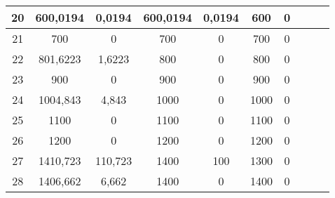 \documentclass[a4paper,12pt]{article}
\theoremstyle{definition}
\begin{document}
\begin{table}[H]
\begin{tabular}{|c|c|c|c|c|c|c|c|c|c|}
    20    & 600,0194 & 0,0194 & 600,0194 & 0,0194 & 600   & 0 \\\hline
    21    & 700   & 0     & 700   & 0     & 700   & 0 \\\hline
    22    & 801,6223 & 1,6223 & 800   & 0     & 800   & 0 \\\hline
    23    & 900   & 0     & 900   & 0     & 900   & 0 \\\hline
    24    & 1004,843 & 4,843 & 1000  & 0     & 1000  & 0 \\\hline
    25    & 1100  & 0     & 1100  & 0     & 1100  & 0 \\\hline
    26    & 1200  & 0     & 1200  & 0     & 1200  & 0 \\\hline
    27    & 1410,723 & 110,723 & 1400  & 100   & 1300  & 0 \\\hline
    28    & 1406,662 & 6,662 & 1400  & 0     & 1400  & 0 \\\hline
\end{tabular}	
\end{table}
\end{document}
